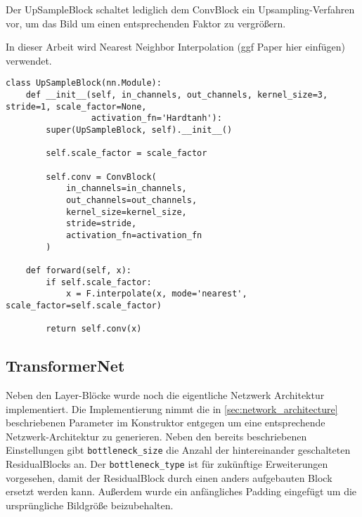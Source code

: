 Der UpSampleBlock schaltet lediglich dem ConvBlock ein Upsampling-Verfahren vor, um das Bild um einen entsprechenden Faktor zu vergrößern.

In dieser Arbeit wird Nearest Neighbor Interpolation (ggf Paper hier einfügen) verwendet.


\begin{listing}[H]
\begin{verbatim}
class UpSampleBlock(nn.Module):
    def __init__(self, in_channels, out_channels, kernel_size=3, stride=1, scale_factor=None,
                 activation_fn='Hardtanh'):
        super(UpSampleBlock, self).__init__()

        self.scale_factor = scale_factor

        self.conv = ConvBlock(
            in_channels=in_channels,
            out_channels=out_channels,
            kernel_size=kernel_size,
            stride=stride,
            activation_fn=activation_fn
        )

    def forward(self, x):
        if self.scale_factor:
            x = F.interpolate(x, mode='nearest', scale_factor=self.scale_factor)

        return self.conv(x)
\end{verbatim}
\end{listing}

\subsection{TransformerNet}

Neben den Layer-Blöcke wurde noch die eigentliche Netzwerk Architektur implementiert. Die Implementierung nimmt die in \ref{sec:network_architecture} beschriebenen Parameter im Konstruktor entgegen um eine entsprechende Netzwerk-Architektur zu generieren. Neben den bereits beschriebenen Einstellungen gibt \texttt{bottleneck_size} die Anzahl der hintereinander geschalteten ResidualBlocks an. Der \texttt{bottleneck_type} ist für zukünftige Erweiterungen vorgesehen, damit der ResidualBlock durch einen anders aufgebauten Block ersetzt werden kann. Außerdem wurde ein anfängliches Padding eingefügt um die ursprüngliche Bildgröße beizubehalten.

